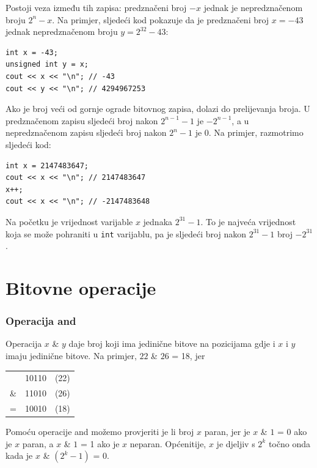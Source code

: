 Postoji veza između tih
zapisa:
predznačeni broj $-x$ jednak je nepredznačenom broju $2^n-x$.
Na primjer, sljedeći kod pokazuje da je
predznačeni broj $x=-43$ jednak nepredznačenom
broju $y=2^{32}-43$:
\begin{lstlisting}
int x = -43;
unsigned int y = x;
cout << x << "\n"; // -43
cout << y << "\n"; // 4294967253
\end{lstlisting}

Ako je broj veći od gornje ograde
bitovnog zapisa, dolazi do prelijevanja broja.
U predznačenom zapisu
sljedeći broj nakon $2^{n-1}-1$ je $-2^{n-1}$,
a u nepredznačenom zapisu
sljedeći broj nakon $2^n-1$ je $0$.
Na primjer, razmotrimo sljedeći kod:
\begin{lstlisting}
int x = 2147483647;
cout << x << "\n"; // 2147483647
x++;
cout << x << "\n"; // -2147483648
\end{lstlisting}

Na početku je vrijednost varijable $x$ jednaka $2^{31}-1$.
To je najveća vrijednost koja se može pohraniti
u \texttt{int} varijablu,
pa je sljedeći broj nakon $2^{31}-1$ broj $-2^{31}$.


\section{Bitovne operacije}

\newcommand\XOR{\mathbin{\char`\^}}

\subsubsection{Operacija and}


Operacija  $x$ \& $y$ daje broj
koji ima jedinične bitove na pozicijama gdje i
$x$ i $y$ imaju jedinične bitove.
Na primjer, $22$ \& $26$ = 18, jer

\begin{center}
\begin{tabular}{rrr}
& 10110 & (22)\\
\& & 11010 & (26) \\
\hline
 = & 10010 & (18) \\
\end{tabular}
\end{center}

Pomoću operacije and možemo provjeriti je li broj
$x$ paran, jer je
$x$ \& $1$ = 0 ako je $x$ paran, a
$x$ \& $1$ = 1 ako je $x$ neparan.
Općenitije, $x$ je djeljiv s $2^k$
točno onda kada je $x$ \& $(2^k-1)$ = 0.

